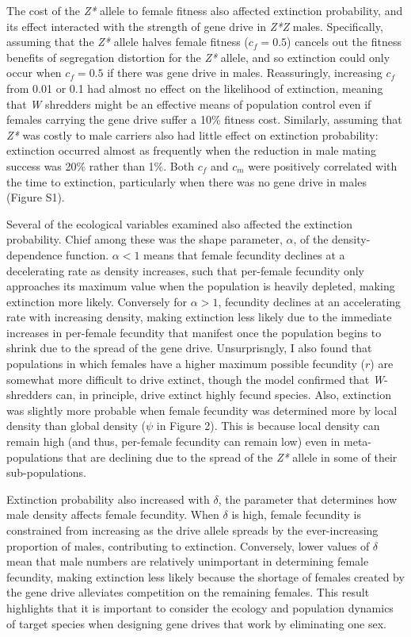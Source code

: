 \documentclass[]{rsos}%
\begin{document}
The cost of the \emph{Z*} allele to female fitness also affected
extinction probability, and its effect interacted with the strength of
gene drive in \emph{Z*Z} males. Specifically, assuming that the
\emph{Z*} allele halves female fitness (\(c_f = 0.5\)) cancels out the
fitness benefits of segregation distortion for the \emph{Z*} allele, and
so extinction could only occur when \(c_f = 0.5\) if there was gene
drive in males. Reassuringly, increasing \(c_f\) from 0.01 or 0.1 had
almost no effect on the likelihood of extinction, meaning that \emph{W}
shredders might be an effective means of population control even if
females carrying the gene drive suffer a 10\% fitness cost. Similarly,
assuming that \emph{Z*} was costly to male carriers also had little
effect on extinction probability: extinction occurred almost as
frequently when the reduction in male mating success was 20\% rather
than 1\%. Both \(c_f\) and \(c_m\) were positively correlated with the
time to extinction, particularly when there was no gene drive in males
(Figure S1).

Several of the ecological variables examined also affected the
extinction probability. Chief among these was the shape parameter,
\(\alpha\), of the density-dependence function. \(\alpha < 1\) means
that female fecundity declines at a decelerating rate as density
increases, such that per-female fecundity only approaches its maximum
value when the population is heavily depleted, making extinction more
likely. Conversely for \(\alpha > 1\), fecundity declines at an
accelerating rate with increasing density, making extinction less likely
due to the immediate increases in per-female fecundity that manifest
once the population begins to shrink due to the spread of the gene
drive. Unsurprisngly, I also found that populations in which females
have a higher maximum possible fecundity (\(r\)) are somewhat more
difficult to drive extinct, though the model confirmed that
\emph{W}-shredders can, in principle, drive extinct highly fecund
species. Also, extinction was slightly more probable when female
fecundity was determined more by local density than global density
(\(\psi\) in Figure 2). This is because local density can remain high
(and thus, per-female fecundity can remain low) even in meta-populations
that are declining due to the spread of the \emph{Z*} allele in some of
their sub-populations.

Extinction probability also increased with \(\delta\), the parameter
that determines how male density affects female fecundity. When
\(\delta\) is high, female fecundity is constrained from increasing as
the drive allele spreads by the ever-increasing proportion of males,
contributing to extinction. Conversely, lower values of \(\delta\) mean
that male numbers are relatively unimportant in determining female
fecundity, making extinction less likely because the shortage of females
created by the gene drive alleviates competition on the remaining
females. This result highlights that it is important to consider the
ecology and population dynamics of target species when designing gene
drives that work by eliminating one sex.
\end{document}

